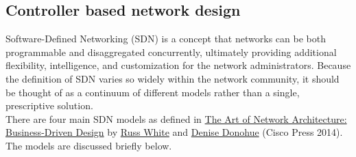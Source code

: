 \subsection{Controller based network design}
Software-Defined Networking (SDN) is a concept that networks can be both
programmable and disaggregated concurrently, ultimately providing additional
flexibility, intelligence, and customization for the network administrators.
Because the definition of SDN varies so widely within the network community,
it should be thought of as a continuum of different models rather than a
single, prescriptive solution. \\

There are four main SDN models as defined in
\href{http://www.ciscopress.com/store/art-of-network-architecture-business-driven-design-9780133259230}{The Art of Network Architecture: Business-Driven Design} by
\href{https://twitter.com/rtggeek}{Russ White} and
\href{ihttps://twitter.com/LadyNetwkr}{Denise Donohue} (Cisco Press 2014).
The models are discussed briefly below.

